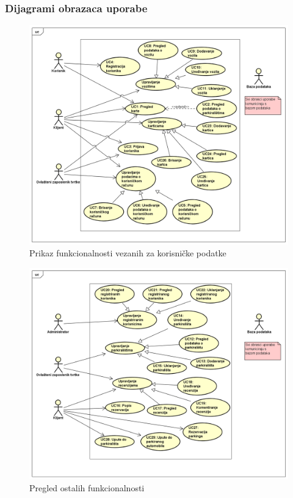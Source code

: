\pagebreak

\subsubsection{Dijagrami obrazaca uporabe}
\begin{figure}[H]
	\includegraphics[width=1\linewidth]{dijagrami/Korisnički podaci.PNG} %
	\caption{Prikaz funkcionalnosti vezanih za korisničke podatke}
	\label{fig:promjene2} %
\end{figure}
\begin{figure}[H]
	\includegraphics[width=1\linewidth]{dijagrami/Pregled ostalih funkcionalnosti.PNG} %
	\caption{Pregled ostalih funkcionalnosti}
	\label{fig:promjene2} %
\end{figure}
\eject		


